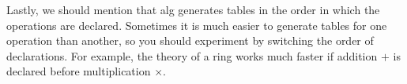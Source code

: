\documentclass{report}
\begin{document}
Lastly, we should mention that alg generates tables in the order in
which the operations are declared. Sometimes it is much easier to
generate tables for one operation than another, so you should experiment
by switching the order of declarations. For example, the theory of a
ring works much faster if addition $+$ is declared before
multiplication $\times$.
\end{document}
